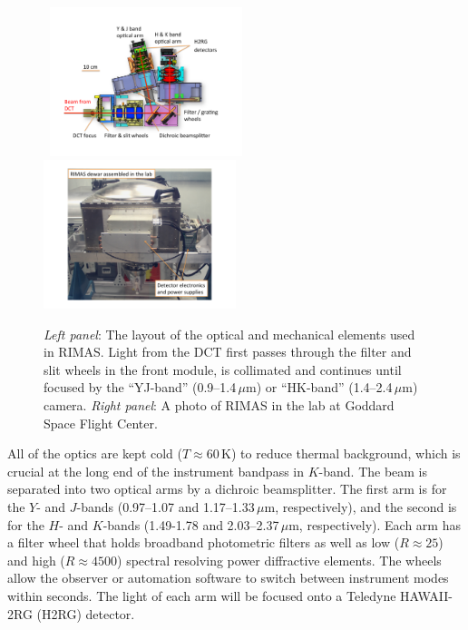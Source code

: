 \documentclass[letterpaper,11pt]{article}
\begin{document}
\begin{figure}[tp!]
\begin{center}
\hbox{
\includegraphics[width=0.5\textwidth]{figures/slide3.pdf}
\includegraphics[width=0.5\textwidth]{figures/slide4.pdf}
}
\vspace{-1.1cm}
\end{center}
\caption{\footnotesize
{{\it Left panel}: The layout of the optical and mechanical elements used in RIMAS.
Light from the DCT first passes through the filter and slit wheels in the 
front module, is collimated and continues until focused by the ``YJ-band'' 
(0.9--1.4\,$\mu$m) or ``HK-band'' (1.4--2.4\,$\mu$m) camera.
{\it Right panel}: A photo of RIMAS in the lab at Goddard Space Flight Center.}}
\end{figure}

All of the optics are kept cold ($T \approx 60$\,K) to reduce 
thermal background, which is crucial at the long end of the instrument 
bandpass in $K$-band. The beam is separated into two optical arms by a
dichroic beamsplitter. The first arm is for the $Y$- and $J$-bands 
(0.97--1.07 and 1.17--1.33\,$\mu$m, respectively), and the second is for the $H$- 
and $K$-bands (1.49-1.78 and 2.03--2.37\,$\mu$m, respectively). Each 
arm has a filter wheel that holds broadband photometric filters as well as low ($R \approx
25$) and high ($R \approx 4500$) spectral resolving power diffractive elements. 
The wheels allow the observer or automation software to switch between instrument modes 
within seconds.  The light of each arm will be focused onto a Teledyne HAWAII-2RG (H2RG) detector.
\end{document}
